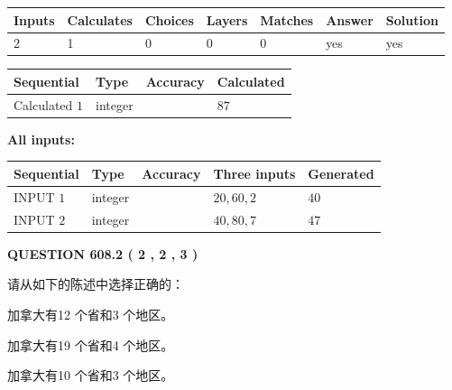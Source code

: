 \documentclass{ctexart}
\begin{document}
   
\noindent\begin{tabular}{|l|l|l|l|l|l|l|}
 \hline
Inputs & Calculates & Choices & Layers & Matches & Answer & Solution \\ \hline
 2  & 
 1  & 
 0
  & 
 0  & 
 0  & 
  yes & 
  yes 
  \\ \hline
 \end{tabular}
   
   
   
   
\noindent{}
   
   
  
  
\noindent\begin{tabular}{|l|l|l|l|}
\hline
 Sequential & Type & Accuracy & Calculated \\ 
\hline
 
 
  Calculated $  1 $ & integer &  & 
  $ 87 $ 
 \\  \hline  
 \end{tabular}
   
   
   
   
\noindent\vspace{0.1in}\hspace{-0.08in} {\textbf{\Large{All inputs: }}}
   
   
  
  
\noindent\begin{tabular}{|l|l|l|l|l|}
\hline
 Sequential & Type & Accuracy & Three inputs & Generated \\ 
\hline
 
 
  INPUT $  1 $ & integer &  & $
 20
 , 
 60
 , 
 2
 $ & $ 40 $ 
 \\  \hline  
 
 
  INPUT $  2 $ & integer &  & $
 40
 , 
 80
 , 
 7
 $ & $ 47 $ 
 \\  \hline  
 \end{tabular}
   
   
  
\vspace{0.2in}
  
{\textbf{\Large{QUESTION
608.2 
 ( 2 , 2 , 3 )
}}}
  
  
请从如下的陈述中选择正确的：
 
 
加拿大有12 个省和3 个地区。
 
 
加拿大有19 个省和4 个地区。
 
 
加拿大有10 个省和3 个地区。
 
\end{document}
